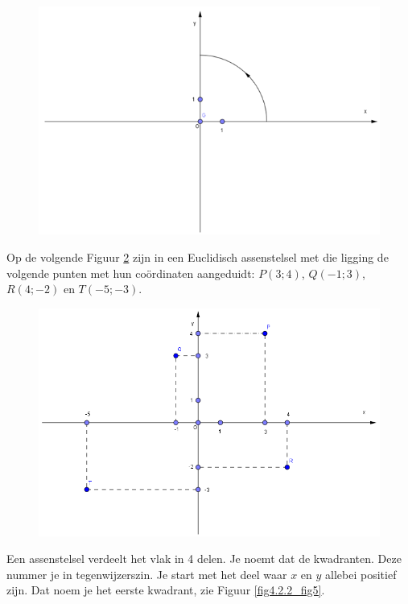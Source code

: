 \begin{figure}[!htb]
\begin{center}
\includegraphics[height=5 cm]{4_opp_inhoud_an_meetk/inputs/AMTekst2Fig3}
\caption{}
\label{fig4.2.2_fig3}
\end{center}
\end{figure}

Op de volgende Figuur \ref{fig4.2.2_fig4} zijn in een Euclidisch assenstelsel met die ligging de volgende punten met hun co\"ordinaten aangeduidt: $P(3;4)$, $Q(-1;3)$, $R(4;-2)$ en $T(-5;-3)$.

\begin{figure}[!htb]
\begin{center}
\includegraphics[width=.7\linewidth]{4_opp_inhoud_an_meetk/inputs/AMTekst2Fig4}
\caption{}
\label{fig4.2.2_fig4}
\end{center}
\end{figure}

Een assenstelsel verdeelt het vlak in 4 delen.
Je noemt dat de kwadranten.
Deze nummer je in tegenwijzerszin. 
Je start met het deel waar $x$ en $y$ allebei positief zijn.
Dat noem je het eerste kwadrant, zie Figuur \ref{fig4.2.2_fig5}.

